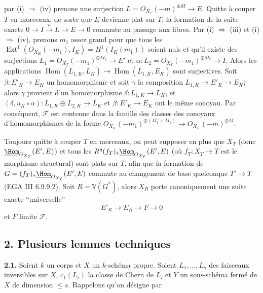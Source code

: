 
par (i) \(\Rightarrow\) (iv) prenons une surjection \(L={O}_{X_T}(-m)^{\oplus M}\longrightarrow E\). Quitte à couper \(T\) en morceaux, de sorte que \(E\) devienne plat sur \(T\), la formation de la suite exacte \(0\longrightarrow I\xrightarrow{u}L\longrightarrow E\longrightarrow0\) commute au passage aux fibres. Par (i) \(\Rightarrow\) (iii) et (i) \(\Rightarrow\) (iv), prenons \(m_1\) assez grand pour que tous les \(\operatorname{Ext}^1({O}_{X_K}(-m_1),I_K)=H^1(I_K(m_1))\) soient nuls et qu'il existe des surjections \(L_1={O}_{X_T}(-m_1)^{\oplus M_1}\longrightarrow E'\) et \(\alpha:L_2={O}_{X_T}(-m_1)^{\oplus M_2}\longrightarrow I\). Alors les applications \(\operatorname{Hom}(L_{1,K},L_K)\longrightarrow \operatorname{Hom}(L_{1,K},E_K)\) sont surjectives. Soit \(\beta:E'_K\to E_K\) un homomorphisme et soit \(\gamma\) la composition \(L_{1,K}\to E'_K\to E_K\); alors \(\gamma\) provient d'un homomorphisme \(\delta:L_{1,K}\to L_K\), et $(\delta,u_K\circ\alpha):L_{1,K}\oplus L_{2,K}\longrightarrow L_K$ et \(\beta:E'_K\to E_K\) ont le même conoyau. Par conséquent, \(\mathcal F\) est contenue dans la famille des classes des conoyaux d'homomorphismes de la forme \({O}_{X_K}(-m_1)^{\oplus(M_1+M_2)}\longrightarrow {O}_{X_K}(-m)^{\oplus M}\).

Toujours quitte à couper \(T\) en morceaux, on peut supposer en plus que \(X_T\) (donc \(\underline{\Hom}_{{O}_{X_T}}(E',E)\)) et tous les \(R^q(f_T)_*\underline{\Hom}_{{O}_{X_T}}(E',E)\) (où \(f_T:X_T\to T\) est le morphisme structural) sont plats sur \(T\), afin que la formation de \(G=(f_T)_*\underline{\Hom}_{{O}_{X_T}}(E',E)\) commute au changement de base quelconque \(T'\to T\) (EGA III 6.9.9.2). Soit $R=\mathbb V(G^*)$, alors \(X_R\) porte canoniquement une suite exacte ``universelle''
\[
E'_R\longrightarrow E_R\longrightarrow F\longrightarrow0
\]
et \(F\) limite \(\mathcal F\).

\subsection*{2. Plusieurs lemmes techniques}
\textbf{2.1.} Soient \(k\) un corps et \(X\) un \(k\)-schéma propre. Soient \(L_1,\ldots,L_s\) des faisceaux inversibles sur \(X\), \(c_1(L_i)\) la classe de Chern de \(L_i\) et \(Y\) un sous-schéma fermé de \(X\) de dimension \(\le s\). Rappelons qu'on désigne par
